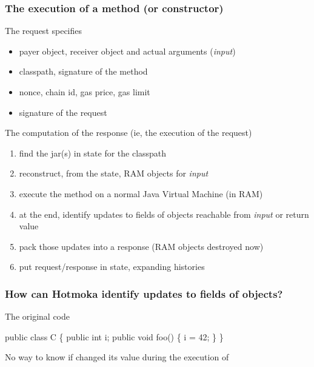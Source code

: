 \documentclass[11pt]{beamer}  %
\def\codesize{\smaller}
\def\<#1>{\codeid{#1}}
\newcommand{\codeid}[1]{\ifmmode{\mbox{\codesize\ttfamily{#1}}}\else{\codesize\ttfamily #1}\fi}
\begin{document}
\begin{frame}\frametitle{The execution of a method (or constructor)}

  \begin{greenbox}{The request specifies}
    \begin{itemize}
    \item payer object, receiver object and actual arguments (\emph{input})
    \item classpath, signature of the method
    \item nonce, chain id, gas price, gas limit
    \item signature of the request
    \end{itemize}
  \end{greenbox}

  \bigskip

  \begin{greenbox}{The computation of the response (ie, the execution of the request)}
    \begin{enumerate}
    \item find the jar(s) in state for the classpath
    \item reconstruct, from the state, RAM objects for \emph{input}
    \item execute the method on a normal Java Virtual Machine (in RAM)
    \item at the end, identify updates to fields of objects reachable from \emph{input}
      or return value
    \item pack those updates into a response (RAM objects destroyed now)
    \item put request/response in state, expanding histories
    \end{enumerate}
  \end{greenbox}

\end{frame}

\begin{frame}[fragile]\frametitle{How can Hotmoka identify updates to fields of objects?}

  \begin{greenbox}{The original code}
    \begin{semiverbatim}
      public class C \{
        public {\color{blue}int i;}
        public void foo() \{
          {\color{blue}i} = 42;
        \}
      \}
    \end{semiverbatim}
  \end{greenbox}

  \begin{center}
    No way to know if \<i> changed its value during the execution of \<foo()>
  \end{center}

\end{frame}
\end{document}
